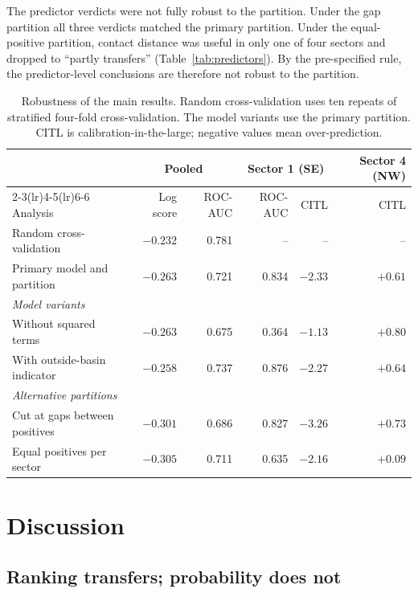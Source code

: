 \documentclass[pdflatex,sn-basic]{sn-jnl}%
\begin{document}
The predictor verdicts were not fully robust to the partition. Under the gap partition all three verdicts matched the primary partition. Under the equal-positive partition, contact distance was useful in only one of four sectors and dropped to ``partly transfers'' (Table~\ref{tab:predictors}). By the pre-specified rule, the predictor-level conclusions are therefore not robust to the partition.

\begin{table}[tbp]
\centering
\small
\caption{Robustness of the main results. Random cross-validation uses ten repeats of stratified four-fold cross-validation. The model variants use the primary partition. CITL is calibration-in-the-large; negative values mean over-prediction.}
\label{tab:robustness}
\footnotesize\setlength{\tabcolsep}{3pt}
\begin{tabular}{lrrrrr}
\toprule
& \multicolumn{2}{c}{Pooled} & \multicolumn{2}{c}{Sector 1 (SE)} & Sector 4 (NW) \\
\cmidrule(lr){2-3}\cmidrule(lr){4-5}\cmidrule(lr){6-6}
Analysis & Log score & ROC-AUC & ROC-AUC & CITL & CITL \\
\midrule
Random cross-validation & $-0.232$ & 0.781 & -- & -- & -- \\
\midrule
Primary model and partition & $-0.263$ & 0.721 & 0.834 & $-2.33$ & $+0.61$ \\
\multicolumn{6}{l}{\emph{Model variants}} \\
\quad Without squared terms & $-0.263$ & 0.675 & 0.364 & $-1.13$ & $+0.80$ \\
\quad With outside-basin indicator & $-0.258$ & 0.737 & 0.876 & $-2.27$ & $+0.64$ \\
\multicolumn{6}{l}{\emph{Alternative partitions}} \\
\quad Cut at gaps between positives & $-0.301$ & 0.686 & 0.827 & $-3.26$ & $+0.73$ \\
\quad Equal positives per sector & $-0.305$ & 0.711 & 0.635 & $-2.16$ & $+0.09$ \\
\bottomrule
\end{tabular}
\end{table}

\section{Discussion}

\subsection{Ranking transfers; probability does not}
\end{document}
